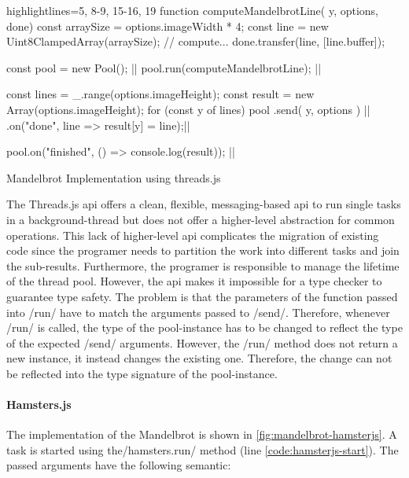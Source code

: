 \begin{listing}
	\begin{javascriptcode*}{highlightlines={5, 8-9, 15-16, 19}}
function computeMandelbrotLine({ y, options}, done) {
	const arraySize = options.imageWidth * 4;
	const line = new Uint8ClampedArray(arraySize);
	// compute...
	done.transfer(line, [line.buffer]);
}

const pool = new Pool(); |$\label{code:threadsjs-pool}$|
pool.run(computeMandelbrotLine); |$\label{code:threadsjs-worker}$|

const lines = _.range(options.imageHeight);
const result = new Array(options.imageHeight);
for (const y of lines) {
	pool
		.send({ y, options }) |$\label{code:threadsjs-messaging}$|
		.on("done", line => result[y] = line);|$\label{code:threadsjs-task-completion}$|
}

pool.on("finished", () => console.log(result)); |$\label{code:threadsjs-done}$|
\end{javascriptcode*}
\caption{Mandelbrot Implementation using threads.js}
\label{fig:mandelbrot-threadsjs}
\end{listing}


The Threads.js api offers a clean, flexible, messaging-based api to run single tasks in a background-thread but does not offer a higher-level abstraction for common operations. This lack of higher-level api complicates the migration of existing code since the programer needs to partition the work into different tasks and join the sub-results. Furthermore, the programer is responsible to manage the lifetime of the thread pool. However, the api makes it impossible for a type checker to guarantee type safety. The problem is that the parameters of the function passed into \javascriptinline/run/ have to match the arguments passed to \javascriptinline/send/. Therefore, whenever \javascriptinline/run/ is called, the type of the pool-instance has to be changed to reflect the type of the expected \javascriptinline/send/ arguments. However, the \javascriptinline/run/ method does not return a new instance, it instead changes the existing one. Therefore, the change can not be reflected into the type signature of the pool-instance.

\paragraph{Hamsters.js}
The implementation of the Mandelbrot is shown in \cref{fig:mandelbrot-hamsterjs}. A task is started using the\javascriptinline/hamsters.run/ method (line \ref{code:hamsterjs-start}). The passed arguments have the following semantic:


